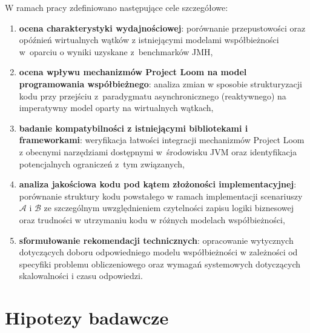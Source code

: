 \noindent
W ramach pracy zdefiniowano następujące cele szczegółowe:
\begin{enumerate}
    \itemsep0em

    \item \textbf{ocena charakterystyki wydajnościowej}: porównanie przepustowości oraz opóźnień wirtualnych wątków z istniejącymi modelami współbieżności w~oparciu o wyniki uzyskane z~benchmarków JMH,
    
    \item \textbf{ocena wpływu mechanizmów Project Loom na model programowania współbieżnego}: analiza zmian w sposobie strukturyzacji kodu przy przejściu z~paradygmatu asynchronicznego (reaktywnego) na imperatywny model oparty na wirtualnych wątkach,

    \item \textbf{badanie kompatybilności z istniejącymi bibliotekami i frameworkami}: weryfikacja łatwości integracji mechanizmów Project Loom z obecnymi narzędziami dostępnymi w~środowisku JVM oraz identyfikacja potencjalnych ograniczeń z~tym związanych,

    \item \textbf{analiza jakościowa kodu pod kątem złożoności implementacyjnej}: porównanie struktury kodu powstałego w ramach implementacji scenariuszy $\mathcal{A}$ i $\mathcal{B}$ ze szczególnym uwzględnieniem czytelności zapisu logiki biznesowej oraz trudności w utrzymaniu kodu w różnych modelach współbieżności,


    \item \textbf{sformułowanie rekomendacji technicznych}: opracowanie wytycznych dotyczących doboru odpowiedniego modelu współbieżności w zależności od specyfiki problemu obliczeniowego oraz wymagań systemowych dotyczących skalowalności i czasu odpowiedzi.
\end{enumerate}

\section{Hipotezy badawcze}
\label{sec:research-hypotheses}

